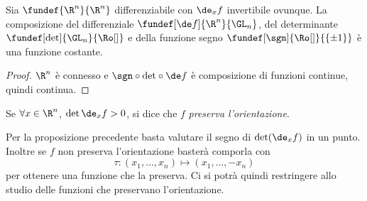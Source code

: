 \begin{prop}
	Sia $\fundef{\R^n}{\R^n}$ differenziabile con $\de_xf$ invertibile ovunque.
	La composizione del differenziale $\fundef[\de f]{\R^n}{\GL_n}$,
	del determinante $\fundef[\det]{\GL_n}{\Ro[]}$
	e della funzione segno $\fundef[\sgn]{\Ro[]}{\{\pm1\}}$
	è una funzione costante.
\end{prop}

\begin{proof}
	$\R^n$ è connesso
	e ${\sgn} \circ {\det} \circ \de f$ è composizione di funzioni continue,
	quindi continua.
\end{proof}

\begin{defn}
	Se $\forall x \in \R^n$, $ \det \de_xf > 0$,
	si dice che $f$ \emph{preserva l'orientazione}.
\end{defn}

\begin{oss}
	Per la proposizione precedente basta valutare il segno di $\det (\de_xf)$ in un punto.
	Inoltre se $f$ non preserva l'orientazione basterà comporla con
	\[\tau:(x_1,\dots,x_n)\mapsto (x_1,\dots,-x_n)\]
	per ottenere una funzione che la preserva.
	Ci si potrà quindi restringere allo studio delle funzioni che preservano l'orientazione.
\end{oss}

